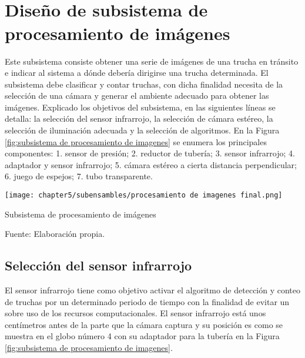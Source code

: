 \chapter[\quad\quad\quad\quad ----- Diseño de subsistema de procesamiento de imágenes]{\\ Diseño de subsistema de procesamiento de imágenes}
\thispagestyle{myportland}

Este subsistema consiste obtener una serie de imágenes de una trucha en tránsito e indicar al sistema a dónde debería dirigirse una trucha determinada. El subsistema debe clasificar y contar truchas, con dicha finalidad necesita de la selección de una cámara y generar el ambiente adecuado para obtener las imágenes. Explicado los objetivos del subsistema, en las siguientes líneas se detalla: la selección del sensor infrarrojo, la selección de cámara estéreo, la selección de iluminación adecuada y la selección de algoritmos. En la Figura \ref{fig:subsistema de procesamiento de imagenes} se enumera los principales componentes: 1. sensor de presión; 2. reductor de tubería; 3. sensor infrarrojo; 4. adaptador y sensor infrarrojo; 5. cámara estéreo a cierta distancia perpendicular; 6. juego de espejos; 7. tubo transparente.

\begin{myfigure}[H]
	\footnotesize\centering
	\texttt{[image: chapter5/subensambles/procesamiento de imagenes final.png]}
	\caption{Subsistema de procesamiento de imágenes}
	\begin{myflushcenter}
		Fuente: Elaboración propia.
	\end{myflushcenter}
	\label{fig:subsistema de procesamiento de imagenes}
\end{myfigure}
 
\section{Selección del sensor infrarrojo}

El sensor infrarrojo tiene como objetivo activar el algoritmo de detección y conteo de truchas por un determinado periodo de tiempo con la finalidad de evitar un sobre uso de los recursos computacionales. El sensor infrarrojo está unos centímetros antes de la parte que la cámara captura y su posición es como se muestra en el globo número 4 con su adaptador para la tubería en la Figura \ref{fig:subsistema de procesamiento de imagenes}.


